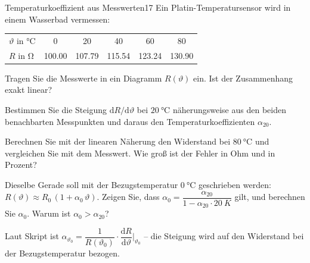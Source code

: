 \documentclass[11pt,a4paper]{article}
\begin{document}
\ifloesung\else\newpage\fi
\begin{aufgabe}{Temperaturkoeffizient aus Messwerten}{17}
Ein Platin-Temperatursensor wird in einem Wasserbad vermessen:
\begin{center}
\begin{tabular}{l*{5}{c}}
\toprule
$\vartheta$ in $\si{\celsius}$ & 0 & 20 & 40 & 60 & 80\\
$R$ in $\si{\ohm}$ & \num{100.00} & \num{107.79} & \num{115.54} & \num{123.24} & \num{130.90}\\
\bottomrule
\end{tabular}
\end{center}
\begin{teilaufgaben}
  \item Tragen Sie die Messwerte in ein Diagramm $R(\vartheta)$ ein. Ist der Zusammenhang exakt linear?
  \item Bestimmen Sie die Steigung $\mathrm{d}R/\mathrm{d}\vartheta$ bei $\SI{20}{\celsius}$ näherungsweise aus den beiden benachbarten Messpunkten und daraus den Temperaturkoeffizienten $\alpha_{20}$.
  \item Berechnen Sie mit der linearen Näherung den Widerstand bei $\SI{80}{\celsius}$ und vergleichen Sie mit dem Messwert. Wie groß ist der Fehler in Ohm und in Prozent?
  \item Dieselbe Gerade soll mit der Bezugstemperatur $\SI{0}{\celsius}$ geschrieben werden: $R(\vartheta) \approx R_0\,(1 + \alpha_0\,\vartheta)$. Zeigen Sie, dass $\alpha_0 = \dfrac{\alpha_{20}}{1 - \alpha_{20}\cdot\SI{20}{K}}$ gilt, und berechnen Sie $\alpha_0$. Warum ist $\alpha_0 > \alpha_{20}$?
\end{teilaufgaben}
\begin{tipp}Laut Skript ist $\alpha_{\vartheta_0} = \dfrac{1}{R(\vartheta_0)}\cdot\dfrac{\mathrm{d}R}{\mathrm{d}\vartheta}\Big|_{\vartheta_0}$ -- die Steigung wird auf den Widerstand bei der Bezugstemperatur bezogen.\end{tipp}
\end{aufgabe}
\end{document}
